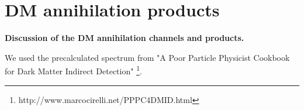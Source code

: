 \section{DM annihilation products}

\textbf{Discussion of the DM annihilation channels and products.}

We used the precalculated spectrum from "A Poor Particle Physicist Cookbook for Dark Matter Indirect Detection" \cite{Cirelli_2011}\footnote{http://www.marcocirelli.net/PPPC4DMID.html}.